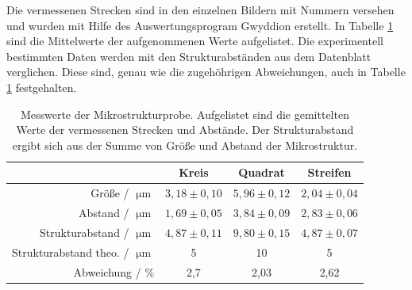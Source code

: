 %
Die vermessenen Strecken sind in den einzelnen Bildern mit Nummern versehen und wurden mit Hilfe des Auswertungsprogram Gwyddion erstellt.
In Tabelle \ref{tab:auf1} sind die Mittelwerte der aufgenommenen Werte aufgelistet.
Die experimentell bestimmten Daten werden mit den Strukturabst\"anden aus dem Datenblatt \cite{anleitung} verglichen.
Diese sind, genau wie die zugeh\"ohrigen Abweichungen, auch in Tabelle \ref{tab:auf1} festgehalten.
\begin{table}
	\centering
	\caption{Messwerte der Mikrostrukturprobe. Aufgelistet sind die gemittelten Werte der vermessenen Strecken und Abst\"ande. Der Strukturabstand ergibt sich aus der Summe von Gr\"o{\ss}e und Abstand der Mikrostruktur.}
\begin{tabular}{|r|ccc|}
	\hline
	{} & {Kreis} & {Quadrat} & {Streifen} \\
	\hline
	Größe / $\upmu \text{m}$ & $3,18 \pm 0,10$ & $5,96 \pm 0,12$ & $2,04 \pm 0,04$ \\
	Abstand / $\upmu \text{m}$ & $1,69 \pm 0,05$ & $3,84 \pm 0,09$ & $2,83 \pm 0,06$ \\
	Strukturabstand / $\upmu \text{m}$ & $4,87 \pm 0,11$ & $ 9,80 \pm 0,15$ & $4,87 \pm 0,07$ \\
	Strukturabstand theo. / $\upmu \text{m}$ & 5 & 10 & 5 \\
	Abweichung / \%	& 2,7 & 2,03 & 2,62 \\
	\hline
\end{tabular}
\label{tab:auf1}
\end{table}


